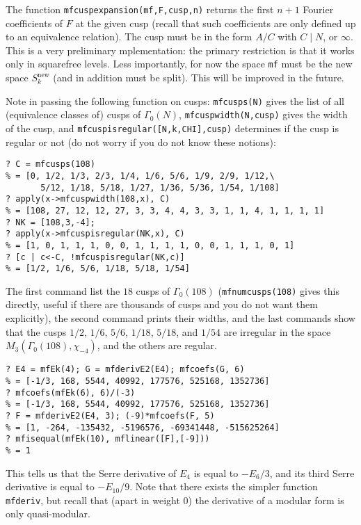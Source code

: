 \documentclass[11pt]{article}
\newcommand{\G}{\Gamma}
\newcommand{\new}{\text{new}}
\def\kbd#1{{\tt #1}}
\begin{document}
The function \kbd{mfcuspexpansion(mf,F,cusp,n)} returns the first $n+1$
Fourier coefficients of $F$ at the given cusp (recall that such coefficients
are only defined up to an equivalence relation). The cusp must be
in the form $A/C$ with $C\mid N$, or $\infty$. This is a very preliminary
mplementation: the primary restriction is that it works only in squarefree
levels. Less importantly, for now the space \kbd{mf} must be the new space
$S_k^{\new}$ (and in addition must be split). This will be improved in the
future.

Note in passing the following function on cusps: \kbd{mfcusps(N)} gives
the list of all (equivalence classes of) cusps of $\G_0(N)$,
\kbd{mfcuspwidth(N,cusp)} gives the width of the cusp, and
\kbd{mfcuspisregular([N,k,CHI],cusp)} determines if the cusp is regular or
not (do not worry if you do not know these notions):

\begin{verbatim}
? C = mfcusps(108)
% = [0, 1/2, 1/3, 2/3, 1/4, 1/6, 5/6, 1/9, 2/9, 1/12,\
       5/12, 1/18, 5/18, 1/27, 1/36, 5/36, 1/54, 1/108]
? apply(x->mfcuspwidth(108,x), C)
% = [108, 27, 12, 12, 27, 3, 3, 4, 4, 3, 3, 1, 1, 4, 1, 1, 1, 1]
? NK = [108,3,-4];
? apply(x->mfcuspisregular(NK,x), C)
% = [1, 0, 1, 1, 1, 0, 0, 1, 1, 1, 1, 0, 0, 1, 1, 1, 0, 1]
? [c | c<-C, !mfcuspisregular(NK,c)]
% = [1/2, 1/6, 5/6, 1/18, 5/18, 1/54]
\end{verbatim}

The first command list the $18$ cusps of $\G_0(108)$ (\kbd{mfnumcusps(108)}
gives this directly, useful if there are thousands of cusps and you do not
want them explicitly), the second command prints their widths, and the last
commands show that the cusps $1/2$, $1/6$, $5/6$, $1/18$, $5/18$, and $1/54$
are irregular in the space $M_3(\G_0(108),\chi_{-4})$, and the others are
regular.

\medskip

\begin{verbatim}
? E4 = mfEk(4); G = mfderivE2(E4); mfcoefs(G, 6)
% = [-1/3, 168, 5544, 40992, 177576, 525168, 1352736]
? mfcoefs(mfEk(6), 6)/(-3)
% = [-1/3, 168, 5544, 40992, 177576, 525168, 1352736]
? F = mfderivE2(E4, 3); (-9)*mfcoefs(F, 5)
% = [1, -264, -135432, -5196576, -69341448, -515625264]
? mfisequal(mfEk(10), mflinear([F],[-9]))
% = 1
\end{verbatim}

This tells us that the Serre derivative of $E_4$ is equal to $-E_6/3$,
and its third Serre derivative is equal to $-E_{10}/9$. Note that there
exists the simpler function \kbd{mfderiv}, but recall that (apart in weight
$0$) the derivative of a modular form is only quasi-modular.
\end{document}
